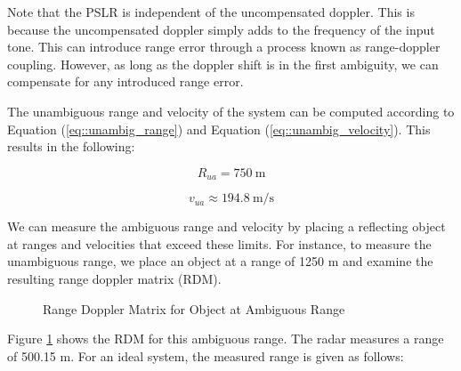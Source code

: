 \documentclass[conference]{IEEEtran}
\begin{document}
	Note that the PSLR is independent of the uncompensated doppler. This is because the uncompensated doppler simply adds to the frequency of the input tone. This can introduce range error through a process known as range-doppler coupling. However, as long as the doppler shift is in the first ambiguity, we can compensate for any introduced range error.
	
	The unambiguous range and velocity of the system can be computed according to Equation (\ref{eq::unambig_range}) and Equation (\ref{eq::unambig_velocity}). This results in the following:
	
	\begin{equation}
		R_{ua} = 750\ \text{m}
	\end{equation}
	
	\begin{equation}
		v_{ua} \approx 194.8\ \text{m/s}
	\end{equation}
	
	We can measure the ambiguous range and velocity by placing a reflecting object at ranges and velocities that exceed these limits. For instance, to measure the unambiguous range, we place an object at a range of 1250 m and examine the resulting range doppler matrix (RDM).
	
	\begin{figure}[H]
	    	\centering
	    	\caption{Range Doppler Matrix for Object at Ambiguous Range}
	    	\label{fig::ambig_range} 
	\end{figure}
	
	Figure \ref{fig::ambig_range} shows the RDM for this ambiguous range. The radar measures a range of 500.15 m. For an ideal system, the measured range is given as follows:
	
\end{document}
